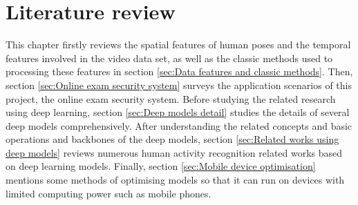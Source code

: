 \chapter{Literature review}
\label{chap:Literature review}
This chapter firstly reviews the spatial features of human poses and the temporal features involved in the video data set, as well as the classic methods used to processing these features in section \ref{sec:Data features and classic methods}.
Then, section \ref{sec:Online exam security system} surveys the application scenarios of this project, the online exam security system.
Before studying the related research using deep learning, section \ref{sec:Deep models detail} studies the details of several deep models comprehensively.
After understanding the related concepts and basic operations and backbones of the deep models, section \ref{sec:Related works using deep models} reviews numerous human activity recognition related works based on deep learning models.
Finally, section \ref{sec:Mobile device optimisation} mentions some methods of optimising models so that it can run on devices with limited computing power such as mobile phones.
